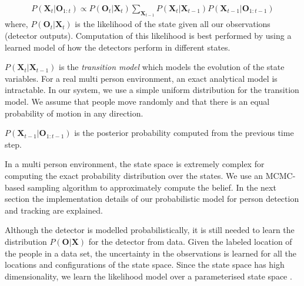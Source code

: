 
\begin{align}
P(\textbf{X}_{t} | \textbf{O}_{1:t}) \propto   P(\textbf{O}_{t} | \textbf{X}_{t}) \sum\limits_{\textbf{X}_{t-1}} P(\textbf{X}_{t}|\textbf{X}_{t-1}) P(\textbf{X}_{t-1}|\textbf{O}_{1:t-1}) \end{align} 
where, $P(\textbf{O}_{t} | \textbf{X}_{t})$ is the likelihood of the state given all our observations (detector outputs). Computation of this likelihood is best performed by using a learned model of how the detectors perform in different states.





$P(\textbf{X}_{t}|\textbf{X}_{t-1})$ is the \textit{transition model} which models the evolution of the state variables. For a real multi person environment, an exact analytical model is intractable. In our system, we use a simple uniform distribution for the transition model. We assume that people move randomly and that there is an equal probability of motion in any direction. 

$P(\textbf{X}_{t-1}|\textbf{O}_{1:t-1})$ is the posterior probability computed from the previous time step.

In a multi person environment, the state space is extremely complex for computing the exact probability 
distribution over the states. We use an MCMC-based sampling algorithm to approximately compute the belief. In the next section the implementation details of our probabilistic model for person detection and tracking are explained.


Although the detector is modelled probabilistically, it is still needed to learn the distribution $P(\textbf{O}|\textbf{X})$ for the detector from data. Given the labeled location of the people in a data set, the uncertainty in the observations is learned for all the locations and configurations of the state space. Since the state space has high dimensionality, we learn the likelihood model over a parameterised state space \cite{berclaz-fleuret-fua-2008}.



